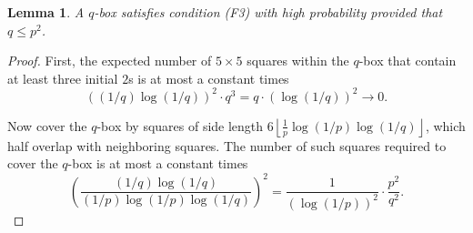 \documentclass{article}
\newcommand{\floor}[1]{\left\lfloor#1\right \rfloor}
\newcommand{\cO}{\mathcal O}
\numberwithin{equation}{section}
\newtheorem{lemma}[theorem]{Lemma}
\newcommand{\note}[1]{{\bf \textcolor{blue}
{[#1\marginpar{\textcolor{red}{***}}]}}}
\begin{document}
\begin{lemma}\label{lem:F3}
    A $q$-box satisfies condition (F3) with high probability provided that $q \le p^2$.
\end{lemma}
\begin{proof}
    First, the expected number of $5\times 5$ squares within the $q$-box that contain at least three initial $2$s is at most a constant times 
    \[
    \left((1/q)\log(1/q)\right)^2 \cdot q^3
    = q\cdot (\log(1/q))^2\to 0.
    \]
    

    Now cover the $q$-box by squares of side length $6 \floor{\frac{1}{p}\log(1/p)\log(1/q)}$, which half overlap with neighboring squares. 
    The number of such squares required to cover the $q$-box is at most
    a constant times 
    \begin{equation}\label{eqn:F3-squares}
    \left(\frac{(1/q)\log(1/q)}{(1/p)\log(1/p)\log(1/q)}\right)^2 = \frac{1}{(\log(1/p))^2} \cdot \frac{p^2}{q^2}.
    \end{equation}
    



\end{proof}
\end{document}
